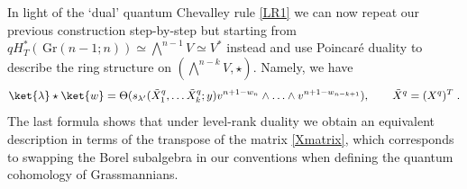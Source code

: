 \documentclass[12pt]{amsart}
\newcommand{\Gr}{\,\mathrm{Gr}}
\numberwithin{equation}{section}
\numberwithin{figure}{section}
\begin{document}
In light of the `dual' quantum Chevalley rule \eqref{LR1} we can now repeat our previous construction step-by-step but starting from $qH^*_T(\Gr(n-1;n))\simeq \bigwedge^{n-1}V\simeq V^*$ instead and use 
Poincar\'e duality to describe the ring structure on $(\bigwedge^{n-k}V,\star)$. Namely, we have
\[
\ket{\lambda}\star\ket{w}=\Theta (s_{\lambda'}(\tilde X^q_1,\ldots\tilde X^q_{k};y)v^{n+1-w_n}\wedge\ldots\wedge v^{n+1-w_{n-k+1}}),\qquad \tilde X^q=(X^q)^T\;.
\]
The last formula shows that under level-rank duality we obtain an equivalent description in terms of the transpose of the matrix \eqref{Xmatrix}, which corresponds to swapping the Borel subalgebra in our conventions when defining the quantum cohomology of Grassmannians.    

\printbibliography
\end{document}
